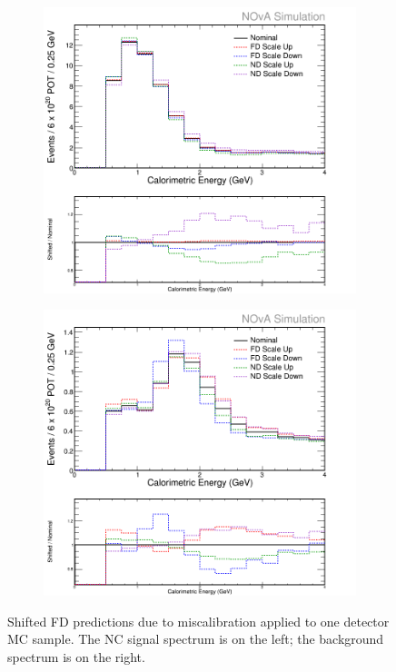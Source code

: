 \begin{figure}[p]
  \centering
  \begin{subfigure}{.48\textwidth}
    \centering
    \includegraphics[width=1\linewidth]{figures/cNCEXCalibRelSysts.png}
  \end{subfigure}
  \begin{subfigure}{.48\textwidth}
    \centering
    \includegraphics[width=1\linewidth]{figures/cBGEXCalibRelSysts.png}
  \end{subfigure}
  \caption[Shifted FD Predictions Due to Miscalibration at One Detector]{Shifted FD predictions due to miscalibration applied to one detector MC sample. The NC signal spectrum is on the left; the background spectrum is on the right.}
  \label{fig:SystCalibRel}
\end{figure}

